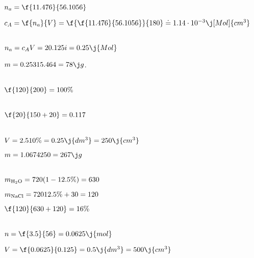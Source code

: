 


\large
$n_a = \f{11.476}{56.1056}$

$ c_A = \f{n_a}{V} = \f{\f{11.476}{56.1056}}{180} \doteq 1.14\cdot10^{-3} \j[Mol]{cm^3}$


\ \\[40px]

$ n_a = c_A\*V = 2 \* 0.125 i= 0.25\j{Mol}$

$m = 0.25 \* 315.464 = 78 \j g$.

\ \\[40px]

$\f{120}{200} = 100 \%$

\ \\[50px]

$\f{20}{150+20} = 0.117$


\ \\[40px]

$V= 2.5 \* 10\% = 0.25 \j{dm^3} = 250 \j{cm^3}$

$m= 1.0674 \* 250 = 267 \j g$


\ \\[40px]

$m_{\rm H_2O} = 720 \* (1-12.5\%) = 630$

$m_{\rm NaCl} = 720 \* 12.5\% + 30 = 120$

$\f{120}{630+120} = 16\%$


\ \\[40px]

$n = \f{ 3.5}{56} =  0.0625 \j{mol}$

$V = \f{0.0625}{0.125} = 0.5 \j{dm^3} = 500 \j{cm^3}$






